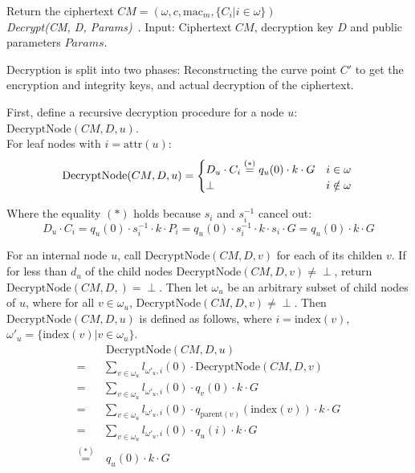 Return the ciphertext $CM = (\omega, c, \text{mac}_m, \{C_i | i \in \omega\})$\\

\emph{Decrypt(CM, D, Params)}~\cite{yao_lightweight_2015}. Input: Ciphertext $CM$, decryption key $D$ and public parameters $Params$.

Decryption is split into two phases: Reconstructing the curve point $C'$ to get the encryption and integrity keys, and actual decryption of the ciphertext.

First, define a recursive decryption procedure for a node $u$: $\text{DecryptNode}(CM, D, u)$. \\ %
For leaf nodes with $i = \text{attr}(u)$:
\begin{equation*}
    \text{DecryptNode}(CM, D, u) = \begin{cases}
        D_u \cdot C_i \stackrel{(*)}{=} q_u(0) \cdot k \cdot G & i \in \omega\\
        \perp & i \notin \omega
    \end{cases}\\
\end{equation*}

Where the equality $(*)$ holds because $s_i$ and $s_i^{-1}$ cancel out: 
\begin{equation*}
    D_u \cdot C_i = q_u(0) \cdot s_i^{-1} \cdot k \cdot P_i = q_u(0) \cdot s_i^{-1} \cdot k \cdot s_i \cdot G = q_u(0) \cdot k \cdot G
\end{equation*}

For an internal node $u$, call $\text{DecryptNode}(CM, D, v)$ for each of its childen $v$. If for less than $d_u$ of the child nodes $\text{DecryptNode}(CM, D, v) \neq \perp$, return $\text{DecryptNode}(CM, D, )=\perp$.
Then let $\omega_u$ be an arbitrary subset of child nodes of $u$, where for all $v \in \omega_u$, $\text{DecryptNode}(CM, D, v) \neq \perp$.
Then $\text{DecryptNode}(CM, D, u)$ is defined as follows, where $i = \text{index}(v)$, $\omega'_u = \{\text{index}(v) | v \in \omega_u\}$.
\begin{equation*}
    \begin{split}
        &~\text{DecryptNode}(CM, D, u)\\
        =& \sum_{v \in \omega_u} l_{\omega'_u, i}(0) \cdot \text{DecryptNode}(CM, D, v)\\
        =& \sum_{v \in \omega_u} l_{\omega'_u, i}(0) \cdot q_v(0) \cdot k \cdot G\\
        =& \sum_{v \in \omega_u} l_{\omega'_u, i}(0) \cdot q_{\text{parent}(v)}(\text{index}(v)) \cdot k \cdot G\\
        =& \sum_{v \in \omega_u} l_{\omega'_u, i}(0) \cdot q_u(i) \cdot k \cdot G\\
        \stackrel{(*)}{=}&~q_u(0) \cdot k \cdot G
    \end{split}
\end{equation*}


